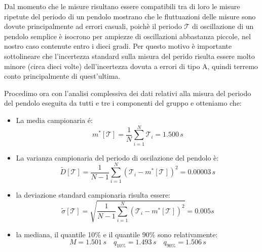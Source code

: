 Dal momento che le misure risultano essere compatibili tra di loro le misure
ripetute del periodo di un pendolo mostrano che le fluttuazioni delle misure
sono dovute principalmente ad errori casuali, poichè il periodo
$\mathcal{T}$ di oscillazione di un pendolo semplice è isocrono per ampiezze
di oscillazioni abbastanza piccole, nel nostro caso contenute entro i dieci gradi.
Per questo motivo è importante sottolineare che l'incertezza standard sulla
misura del perido risulta essere molto minore (circa dieci volte) dell'incertezza
dovuta a errori di tipo A, quindi terremo conto principalmente di quest'ultima.

Procedimo ora con l'analisi complessiva dei dati relativi alla misura del
periodo del pendolo eseguita da tutti e tre i componenti del gruppo e otteniamo che:

\begin{itemize}
    \item{La media campionaria é:}
        \begin{equation}
            m^*[\mathcal{T}] = \frac{1}{N} \sum_{i=1}^{N} \mathcal{T}_i = 1.500\,s
        \end{equation} 

    \item{La varianza campionaria del periodo di oscilazione del pendolo è:}
        \begin{equation}
            \tilde{D}[\mathcal{T}] = \frac{1}{N - 1} \sum_{i=1}^{N} (\mathcal{T}_i - m^*[\mathcal{T}])^2 = 0.00003\,s
        \end{equation}

    \item{la deviazione standard campionaria risulta essere:}
        \begin{equation}
            \tilde{\sigma}[\mathcal{T}] = \sqrt{\frac{1}{N - 1} \sum_{i=1}^{N} (\mathcal{T}_i - m^*[\mathcal{T}])^2} = 0.005 s
        \end{equation}

    \item{la mediana, il quantile 10\% e il quantile 90\% sono relativamente:}
        \begin{equation*}
            M = 1.501\,s \quad
            q_{10\%} = 1.493\,s \quad
            q_{90\%} = 1.506\,s
        \end{equation*}
\end{itemize}

